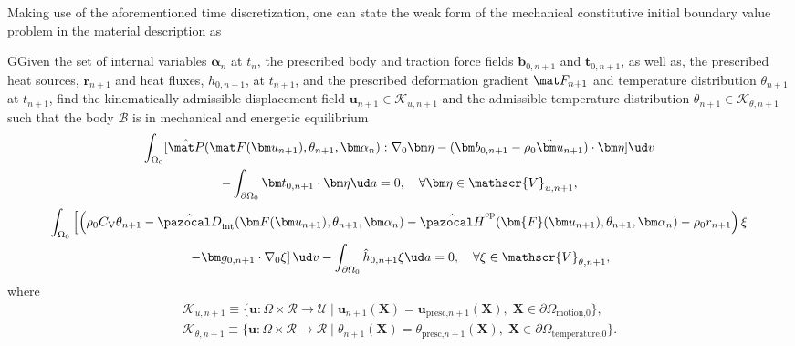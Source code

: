Making use of the aforementioned time discretization, one can state the weak form of the mechanical constitutive initial boundary value problem in the material description as
\begin{problem}
    GGiven the set of internal variables $\bm \alpha_n$ at $t_n$, the prescribed body and traction force fields $\bm b_{0,n+1}$ and $\bm t_{0,n+1}$, as well as, the prescribed heat sources, \(\bm r_{n+1}\) and heat fluxes, \(h_{0,n+1}\), at $t_{n+1}$, and the prescribed deformation gradient $\mat F_{n+1}$ and temperature distribution \(\theta_{n+1}\) at $t_{n+1}$, find the kinematically admissible displacement field $\bm u_{n+1}\in\mathscr{K}_{u,n+1}$ and the admissible temperature distribution \(\theta_{n+1}\in\mathscr K_{\theta,n+1}\) such that the body $\mathscr{B}$ is in mechanical and energetic equilibrium
            \begin{multline}
        \int_{\Omega_0} [\hat{\mat P}(\mat F(\bm u_{n+1}), \theta_{n+1}, \bm \alpha_n):\nabla_0 \bm \eta - (\bm b_{0,n+1}-\rho_0\ddot{\bm u}_{n+1})\cdot \bm \eta]\ud v\\ - \int_{\partial\Omega_0} \bm t_{0,n+1}\cdot \bm \eta\ud a = 0,\quad \forall \bm \eta \in \mathscr{V}_{u,n+1},
        \end{multline}
        \begin{multline}
        \int_{\Omega_0}   \left[\left(\rho_0C_\mathrm{V}\dot\theta_{n+1} -\hat{\pazocal D}_\text{int}(\bm F(\bm u_{n+1}), \theta_{n+1}, \bm \alpha_n) - \hat{\pazocal H}^\text{ep}(\bm{F}(\bm u_{n+1}), \theta_{n+1}, \bm \alpha_n)- \rho_0 r_{n+1} \right) \xi\right.\\
        \left. - \bm g_{0,n+1}\cdot \nabla_0 \xi\right]\ud v - \int_{\partial\Omega_0} \hat h_{0,n+1} \xi\ud a = 0,\quad \forall \xi \in \mathscr{V}_{\theta,n+1},
    \end{multline}
    where
    \begin{gather}
            \mathscr{K}_{u,n+1}\equiv \{\bm u:\Omega\times \mathscr{R}\to \mathscr{U}\;|\;\bm u_{n+1}(\bm X) = \bm u_\text{presc,$n+1$}(\bm X),\;\bm X\in\partial \Omega_\text{motion,0}\},\\
            \mathscr{K}_{\theta, n+1}\equiv \{\bm u:\Omega\times \mathscr{R}\to \mathscr{R}\;|\;\theta_{n+1}(\bm X) = \theta_\text{presc,$n+1$}(\bm X),\;\bm X\in\partial \Omega_\text{temperature,0}\}.
    \end{gather}
\end{problem}

